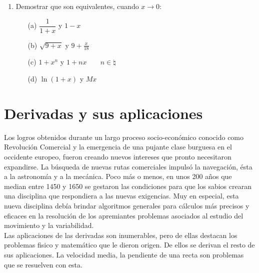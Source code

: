 \documentclass[10pt,twoside]{SelfArx} %
\begin{document}
\begin{enumerate}
\begin{enumerate}
		\end{enumerate}
	
	\item	Demostrar que son equivalentes, cuando $ x\rightarrow0 $:	%
		\begin{enumerate}
			\item[(a)]	$ \dfrac{1}{1+x} $ y $  1-x $ 
			\item[(b)]	$ \sqrt{9+x} $ y $ 9+\frac{x}{18} $
			\item[(c)]	$ 1+x^{n} $ y $ 1+nx\;\;\;\;\;\;\;n\in\natural $
			\item[(d)]	$ \ln(1+x) $ y $ Mx $
		\end{enumerate}

	
\end{enumerate}
\section{Derivadas y sus aplicaciones}
Los logros obtenidos durante un largo proceso socio-económico conocido como Revolución Comercial y la emergencia de una pujante clase burguesa en el occidente europeo, fueron creando nuevos intereses que pronto necesitaron expandirse. La búsqueda de nuevas rutas comerciales impulsó la navegación, ésta a la astronomía y a la mecánica. Poco más o menos, en unos 200 años que median entre 1450 y 1650 se gestaron las condiciones para que los sabios crearan una disciplina que respondiera a las nuevas exigencias. Muy en especial, esta nueva disciplina debía brindar algoritmos generales para cálculos más precisos y eficaces en la resolución de los apremiantes problemas asociados al estudio del movimiento y la variabilidad. \\
Las aplicaciones de las derivadas son inumerables, pero de ellas destacan los problemas fisico y matemático que le dieron origen. De ellos se derivan el resto de sus aplicaciones. La velocidad media, la pendiente de una recta son problemas que se resuelven con esta.
\end{document}
